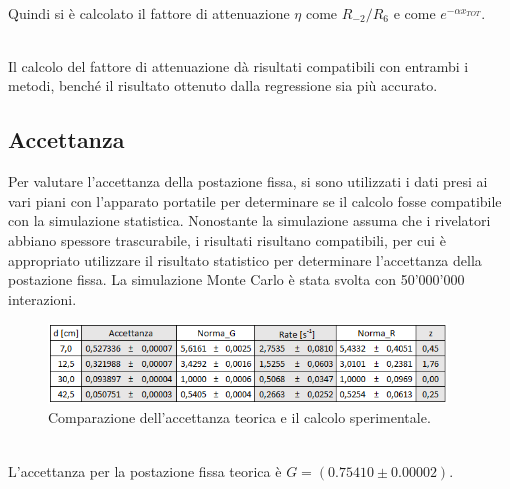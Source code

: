 \documentclass[11pt]{article} %
\begin{document}
\\Quindi si è calcolato il fattore di attenuazione $\eta$ come $R_{-2}/R_{6}$ e come $e^{-\alpha x_{TOT}}$.
\begin{table}[!h]
\begin{center}
\end{center}
\caption{Confronto dei fattori di attenuazione}
\end{table}
\\Il calcolo del fattore di attenuazione dà risultati compatibili con entrambi i metodi, benché il risultato ottenuto dalla regressione sia più accurato.
\subsection{Accettanza}
Per valutare l'accettanza della postazione fissa, si sono utilizzati i dati presi ai vari piani con l'apparato portatile per determinare se il calcolo fosse compatibile con la simulazione statistica. Nonostante la simulazione assuma che i rivelatori abbiano spessore trascurabile, i risultati risultano compatibili, per cui è appropriato utilizzare il risultato statistico per determinare l'accettanza della postazione fissa. La simulazione Monte Carlo è stata svolta con 50'000'000 interazioni.
\begin{figure}[h!]
\begin{center}
\includegraphics[width=400px]{img/table_ACC.png}
\caption{Comparazione dell'accettanza teorica e il calcolo sperimentale.}
\label{fig:ACC}
\end{center}
\end{figure}
\\L'accettanza per la postazione fissa teorica è $G=\left(0.75410\pm0.00002\right)$.
\end{document}
